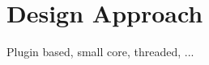 
\chapter{Design Approach} \label{chapter:designapproach}

Plugin based, small core, threaded, ...

